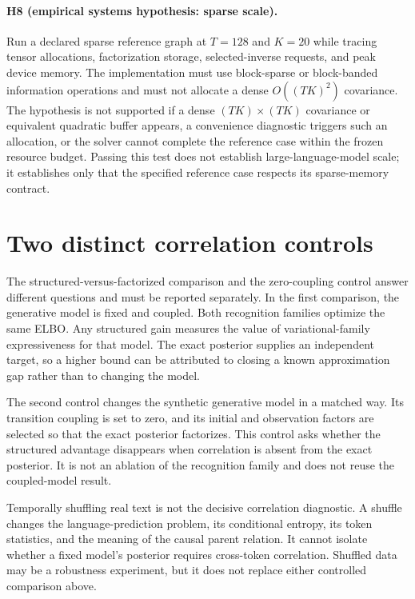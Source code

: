 \paragraph{H8 (empirical systems hypothesis: sparse scale).}
Run a declared sparse reference graph at $T=128$ and $K=20$ while tracing tensor allocations, factorization storage, selected-inverse requests, and peak device memory. The implementation must use block-sparse or block-banded information operations and must not allocate a dense $O((TK)^2)$ covariance. The hypothesis is not supported if a dense $(TK)\times(TK)$ covariance or equivalent quadratic buffer appears, a convenience diagnostic triggers such an allocation, or the solver cannot complete the reference case within the frozen resource budget. Passing this test does not establish large-language-model scale; it establishes only that the specified reference case respects its sparse-memory contract.

\section{Two distinct correlation controls}

The structured-versus-factorized comparison and the zero-coupling control answer different questions and must be reported separately. In the first comparison, the generative model is fixed and coupled. Both recognition families optimize the same ELBO. Any structured gain measures the value of variational-family expressiveness for that model. The exact posterior supplies an independent target, so a higher bound can be attributed to closing a known approximation gap rather than to changing the model.

The second control changes the synthetic generative model in a matched way. Its transition coupling is set to zero, and its initial and observation factors are selected so that the exact posterior factorizes. This control asks whether the structured advantage disappears when correlation is absent from the exact posterior. It is not an ablation of the recognition family and does not reuse the coupled-model result.

Temporally shuffling real text is not the decisive correlation diagnostic. A shuffle changes the language-prediction problem, its conditional entropy, its token statistics, and the meaning of the causal parent relation. It cannot isolate whether a fixed model's posterior requires cross-token correlation. Shuffled data may be a robustness experiment, but it does not replace either controlled comparison above.

